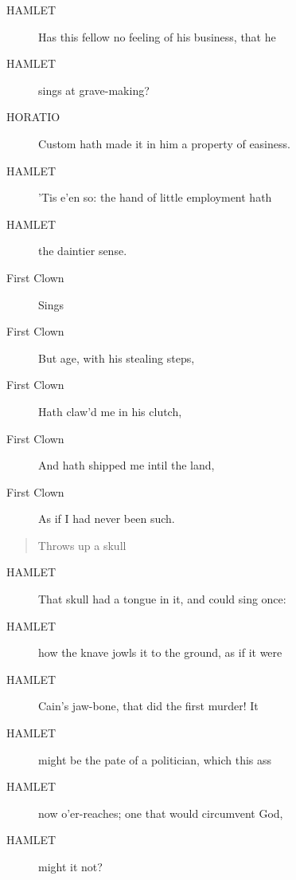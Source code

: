 \documentclass{article}
\begin{document}
\begin{description}
            
\item[HAMLET] Has this fellow no feeling of his business, that he
\item[HAMLET] sings at grave-making?
\end{description}
          
\begin{description}
            
\item[HORATIO] Custom hath made it in him a property of easiness.
\end{description}
          
\begin{description}
            
\item[HAMLET] 'Tis e'en so: the hand of little employment hath
\item[HAMLET] the daintier sense.
\end{description}
          
\begin{description}
            
\item[First Clown] 
               Sings
            
\item[First Clown] But age, with his stealing steps,
\item[First Clown] Hath claw'd me in his clutch,
\item[First Clown] And hath shipped me intil the land,
\item[First Clown] As if I had never been such.
\end{description}
          
\begin{quote}
Throws up a skull
\end{quote}
          
\begin{description}
            
\item[HAMLET] That skull had a tongue in it, and could sing once:
\item[HAMLET] how the knave jowls it to the ground, as if it were
\item[HAMLET] Cain's jaw-bone, that did the first murder! It
\item[HAMLET] might be the pate of a politician, which this ass
\item[HAMLET] now o'er-reaches; one that would circumvent God,
\item[HAMLET] might it not?
\end{description}
          
\end{document}
